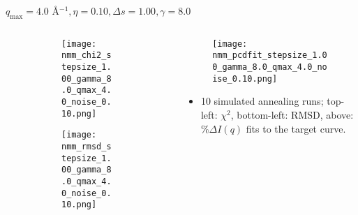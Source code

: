 \documentclass{beamer}
\begin{document}
\begin{frame}{$ q_{\textrm{max}}=4.0 $ \AA $^{-1}, \eta=0.10, \Delta s=1.00, \gamma=8.0$}
	\begin{columns}
		\begin{column}{.5\textwidth}
			\begin{figure}[H]
			\centering
			\begin{subfigure}[b]{\textwidth}
				\centering
				\texttt{[image: nmm\_chi2\_stepsize\_1.00\_gamma\_8.0\_qmax\_4.0\_noise\_0.10.png]}
				\label{fig:}
			\end{subfigure}
			\begin{subfigure}[b]{\textwidth}
				\centering
				\texttt{[image: nmm\_rmsd\_stepsize\_1.00\_gamma\_8.0\_qmax\_4.0\_noise\_0.10.png]}
				\label{fig:}
			\end{subfigure}
			\end{figure}
		\end{column}
		\begin{column}{.5\textwidth}
			\begin{figure}[H]
				\centering
				\texttt{[image: nmm\_pcdfit\_stepsize\_1.00\_gamma\_8.0\_qmax\_4.0\_noise\_0.10.png]}
				\label{fig:}
			\end{figure}
			\begin{itemize}
				\item 10 simulated annealing runs; top-left: $\chi^2$, bottom-left: RMSD, above: $\%\Delta I(q)$ fits to the target curve.
			\end{itemize}
		\end{column}
	\end{columns}
\end{frame}
 
\end{document}
